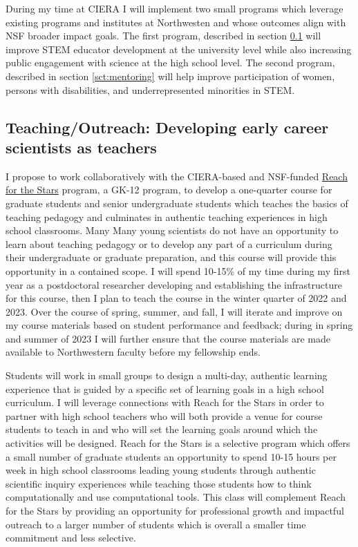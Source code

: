 \documentclass[aasms,11pt]{article}
\begin{document}
\label{sct:outreach}
During my time at CIERA I will implement two small programs which leverage existing programs and institutes at Northwesten and whose outcomes align with NSF broader impact goals.
The first program, described in section \ref{sct:inquiry_class} will improve STEM educator development at the university level while also increasing public engagement with science at the high school level.
The second program, described in section \ref{sct:mentoring} will help improve participation of women, persons with disabilities, and underrepresented minorities in STEM.

\subsection{Teaching/Outreach: Developing early career scientists as teachers}
\label{sct:inquiry_class}
I propose to work collaboratively with the CIERA-based and NSF-funded \href{http://gk12.ciera.northwestern.edu/}{Reach for the Stars} program, a GK-12 program, to develop a one-quarter course for graduate students and senior undergraduate students which teaches the basics of teaching pedagogy and culminates in authentic teaching experiences in high school classrooms.
Many Many young scientists do not have an opportunity to learn about teaching pedagogy or to develop any part of a curriculum during their undergraduate or graduate preparation, and this course will provide this opportunity in a contained scope.
I will spend 10-15\% of my time during my first year as a postdoctoral researcher developing and establishing the infrastructure for this course, then I plan to teach the course in the winter quarter of 2022 and 2023.
Over the course of spring, summer, and fall, I will iterate and improve on my course materials based on student performance and feedback; during in spring and summer of 2023 I will further ensure that the course materials are made available to Northwestern faculty before my fellowship ends.

Students will work in small groups to design a multi-day, authentic learning experience that is guided by a specific set of learning goals in a high school curriculum.
I will leverage connections with Reach for the Stars in order to partner with high school teachers who will both provide a venue for course students to teach in and who will set the learning goals around which the activities will be designed.
Reach for the Stars is a selective program which offers a small number of graduate students an opportunity to spend 10-15 hours per week in high school classrooms leading young students through authentic scientific inquiry experiences while teaching those students how to think computationally and use computational tools.
This class will complement Reach for the Stars by providing an opportunity for professional growth and impactful outreach to a larger number of students which is overall a smaller time commitment and less selective.
\end{document}
